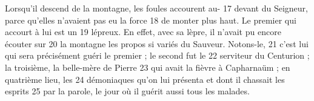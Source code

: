Lorsqu'il descend de la montagne, les foules accourent au-	 
17	 	devant du Seigneur, parce qu'elles n'avaient pas eu la force	 
18	 	de monter plus haut. Le premier qui accourt à lui est un	 
19	 	lépreux. En effet, avec sa lèpre, il n'avait pu encore écouter sur	 
20	 	la montagne les propos si variés du Sauveur. Notons-le,	 
21	 	c'est lui qui sera précisément guéri le premier ; le second fut le	 
22	 	serviteur du Centurion ; la troisième, la belle-mère de Pierre	 
23	 	qui avait la fièvre à Capharnaüm ; en quatrième lieu, les	 
24	 	démoniaques qu'on lui présenta et dont il chassait les esprits	 
25	 	par la parole, le jour où il guérit aussi tous les malades.